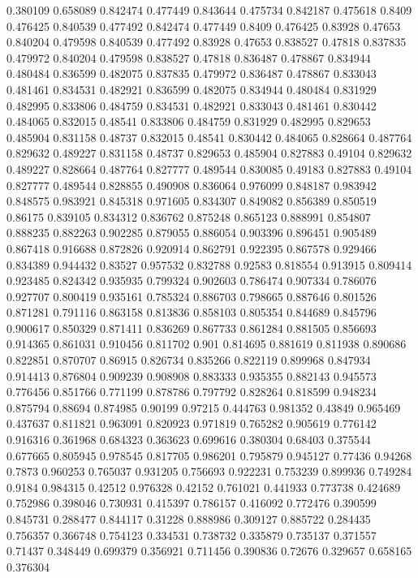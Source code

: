 0.380109 0.658089
0.842474 0.477449
0.843644 0.475734
0.842187 0.475618
0.8409 0.476425
0.840539 0.477492
0.842474 0.477449
0.8409 0.476425
0.83928 0.47653
0.840204 0.479598
0.840539 0.477492
0.83928 0.47653
0.838527 0.47818
0.837835 0.479972
0.840204 0.479598
0.838527 0.47818
0.836487 0.478867
0.834944 0.480484
0.836599 0.482075
0.837835 0.479972
0.836487 0.478867
0.833043 0.481461
0.834531 0.482921
0.836599 0.482075
0.834944 0.480484
0.831929 0.482995
0.833806 0.484759
0.834531 0.482921
0.833043 0.481461
0.830442 0.484065
0.832015 0.48541
0.833806 0.484759
0.831929 0.482995
0.829653 0.485904
0.831158 0.48737
0.832015 0.48541
0.830442 0.484065
0.828664 0.487764
0.829632 0.489227
0.831158 0.48737
0.829653 0.485904
0.827883 0.49104
0.829632 0.489227
0.828664 0.487764
0.827777 0.489544
0.830085 0.49183
0.827883 0.49104
0.827777 0.489544
0.828855 0.490908
0.836064 0.976099
0.848187 0.983942
0.848575 0.983921
0.845318 0.971605
0.834307 0.849082
0.856389 0.850519
0.86175 0.839105
0.834312 0.836762
0.875248 0.865123
0.888991 0.854807
0.888235 0.882263
0.902285 0.879055
0.886054 0.903396
0.896451 0.905489
0.867418 0.916688
0.872826 0.920914
0.862791 0.922395
0.867578 0.929466
0.834389 0.944432
0.83527 0.957532
0.832788 0.92583
0.818554 0.913915
0.809414 0.923485
0.824342 0.935935
0.799324 0.902603
0.786474 0.907334
0.786076 0.927707
0.800419 0.935161
0.785324 0.886703
0.798665 0.887646
0.801526 0.871281
0.791116 0.863158
0.813836 0.858103
0.805354 0.844689
0.845796 0.900617
0.850329 0.871411
0.836269 0.867733
0.861284 0.881505
0.856693 0.914365
0.861031 0.910456
0.811702 0.901
0.814695 0.881619
0.811938 0.890686
0.822851 0.870707
0.86915 0.826734
0.835266 0.822119
0.899968 0.847934
0.914413 0.876804
0.909239 0.908908
0.883333 0.935355
0.882143 0.945573
0.776456 0.851766
0.771199 0.878786
0.797792 0.828264
0.818599 0.948234
0.875794 0.88694
0.874985 0.90199
0.97215 0.444763
0.981352 0.43849
0.965469 0.437637
0.811821 0.963091
0.820923 0.971819
0.765282 0.905619
0.776142 0.916316
0.361968 0.684323
0.363623 0.699616
0.380304 0.68403
0.375544 0.677665
0.805945 0.978545
0.817705 0.986201
0.795879 0.945127
0.77436 0.94268
0.7873 0.960253
0.765037 0.931205
0.756693 0.922231
0.753239 0.899936
0.749284 0.9184
0.984315 0.42512
0.976328 0.42152
0.761021 0.441933
0.773738 0.424689
0.752986 0.398046
0.730931 0.415397
0.786157 0.416092
0.772476 0.390599
0.845731 0.288477
0.844117 0.31228
0.888986 0.309127
0.885722 0.284435
0.756357 0.366748
0.754123 0.334531
0.738732 0.335879
0.735137 0.371557
0.71437 0.348449
0.699379 0.356921
0.711456 0.390836
0.72676 0.329657
0.658165 0.376304
